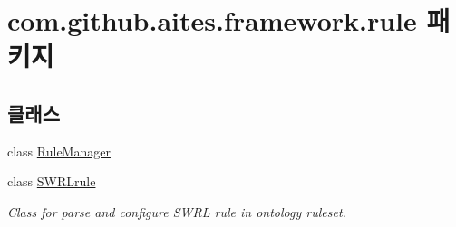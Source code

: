 \hypertarget{namespacecom_1_1github_1_1aites_1_1framework_1_1rule}{}\section{com.\+github.\+aites.\+framework.\+rule 패키지}
\label{namespacecom_1_1github_1_1aites_1_1framework_1_1rule}
\subsection*{클래스}
\begin{DoxyCompactItemize}
\item 
class \mbox{\hyperlink{classcom_1_1github_1_1aites_1_1framework_1_1rule_1_1_rule_manager}{Rule\+Manager}}
\item 
class \mbox{\hyperlink{classcom_1_1github_1_1aites_1_1framework_1_1rule_1_1_s_w_r_lrule}{S\+W\+R\+Lrule}}
\begin{DoxyCompactList}\small\item\em Class for parse and configure S\+W\+RL rule in ontology ruleset. \end{DoxyCompactList}\end{DoxyCompactItemize}

